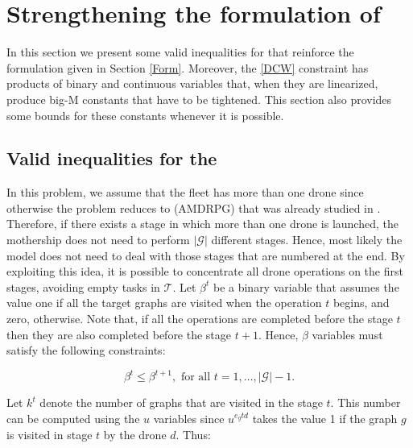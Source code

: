 \section{Strengthening the formulation of \AMD}\label{bounds}
\noindent
In this section we present some valid inequalities for \AMD\xspace that reinforce the formulation given in Section \ref{Form}. Moreover, the \eqref{DCW} constraint has products of binary and continuous variables that, when they are linearized, produce big-M constants that have to be tightened. This section also provides some bounds for these constants whenever it is possible. 



\subsection{Valid inequalities for the \AMD}
\noindent
In this problem, we assume that the fleet has more than one drone since otherwise the problem reduces to (AMDRPG) that was already studied in \cite{art:Amorosi2021}. Therefore, if there exists a stage in which more than one drone is launched, the mothership does not need to perform $|\mathcal G|$ different stages. Hence, most likely the model does not need to deal with those stages that are numbered at the end. By exploiting this idea, it is possible to concentrate all drone operations on the first stages, avoiding empty tasks in $\mathcal T$.
\noindent
Let $\beta^t$ be a binary variable that assumes the value one if all the target graphs are visited when the operation $t$ begins, and  zero, otherwise. Note that, if all the operations are completed before the stage $t$ then they are also completed before the stage $t+1$. Hence, $\beta$ variables must satisfy the following constraints:

\begin{equation}\tag{Monotonicity}\label{eq:Monotonicity}
\beta^t \leq \beta^{t+1}, \mbox{ for all } t=1,\ldots, |\mathcal{G}|-1.
\end{equation}

\noindent
Let $k^t$ denote the number of graphs that are visited in the stage $t$. This number can be computed using the $u$ variables since $u^{e_gtd}$ takes the value 1 if the graph $g$ is visited in stage $t$ by the drone $d$. Thus:

